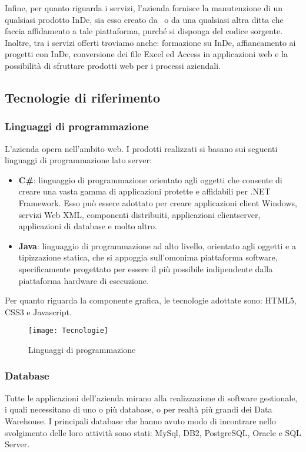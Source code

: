 Infine, per quanto riguarda i servizi, l'azienda fornisce la manutenzione di un qualsiasi prodotto InDe, sia esso creato da \azienda\ o da una qualsiasi altra ditta che faccia affidamento a tale piattaforma, purché si disponga del codice sorgente. Inoltre, tra i servizi offerti troviamo anche: formazione su InDe, affiancamento ai progetti con InDe, conversione dei file Excel ed Access in applicazioni web e la possibilità di sfruttare prodotti web per i processi aziendali.


\subsection{Tecnologie di riferimento}
\label{cap1:Tecnologie di riferimento}
\subsubsection*{Linguaggi di programmazione}

L'azienda opera nell'ambito web. I prodotti realizzati si basano sui seguenti linguaggi di programmazione lato server: 
\begin{itemize}
	\item \textbf{C\#}: linguaggio di programmazione orientato agli oggetti che consente di creare una vasta gamma di applicazioni protette e affidabili per .NET Framework. Esso può essere adottato per creare applicazioni client Windows, servizi Web XML, componenti distribuiti, applicazioni client\-server, applicazioni di database e molto altro.
	
	\item \textbf{Java}: linguaggio di programmazione ad alto livello, orientato agli oggetti e a tipizzazione statica, che si appoggia sull'omonima piattaforma software, specificamente progettato per essere il più possibile indipendente dalla piattaforma hardware di esecuzione.
\end{itemize}

Per quanto riguarda la componente grafica, le tecnologie adottate sono: HTML5, CSS3 e Javascript.

\begin{figure}[!h] 
	\centering 
	\texttt{[image: Tecnologie]} 
	\caption{Linguaggi di programmazione}
	\label{tecnologie}
\end{figure}

\subsubsection*{Database}
Tutte le applicazioni dell'azienda mirano alla realizzazione di software gestionale, i quali necessitano di uno o più database, o per realtà più grandi dei Data Warehouse. I principali  database che hanno avuto modo di incontrare nello svolgimento delle loro attività sono stati: MySql, DB2, PostgreSQL, Oracle e SQL Server.\\

